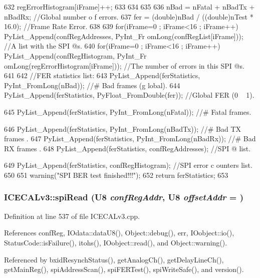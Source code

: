 \begin{DoxyCode}
{{{{632                 regErrorHistogram[iFrame]++;
633             }
634         }
635     }
636     nBad = nFatal + nBadTx + nBadRx;                            //Global number o
      f errors.
637     fer = (double)nBad / ((double)nTest * 16.0);    //Frame Rate Error.
638 
639     for(iFrame=0 ; iFrame<16 ; iFrame++) PyList_Append(confRegAddresses, PyInt_Fr
      omLong(confRegList[iFrame]));               //A list with the SPI @s.
640     for(iFrame=0 ; iFrame<16 ; iFrame++) PyList_Append(confRegHistogram, PyInt_Fr
      omLong(regErrorHistogram[iFrame])); //The number of errors in this SPI @s.
641 
642     //FER statistics list:
643     PyList_Append(ferStatistics, PyInt_FromLong(nBad));         //# Bad frames (g
      lobal).
644     PyList_Append(ferStatistics, PyFloat_FromDouble(fer));  //Global FER (0 ~ 1).
      
645     PyList_Append(ferStatistics, PyInt_FromLong(nFatal));       //# Fatal frames.
      
646     PyList_Append(ferStatistics, PyInt_FromLong(nBadTx));       //# Bad TX frames
      .
647     PyList_Append(ferStatistics, PyInt_FromLong(nBadRx));       //# Bad RX frames
      .
648     PyList_Append(ferStatistics, confRegAddresses);                 //SPI @ list.
      
649     PyList_Append(ferStatistics, confRegHistogram);                 //SPI error c
      ounters list.
650 
651     warning("SPI BER test finished!!!");
652     return ferStatistics;
653 }
\end{DoxyCode}
\hypertarget{classICECALv3_aced41ce20a0853d6248b8df88412e57a}{
\subsubsection[{spiRead}]{ ICECALv3::spiRead ({\bf U8} {\em confRegAddr}, \/  {\bf U8} {\em offsetAddr} = {})}}
\label{classICECALv3_aced41ce20a0853d6248b8df88412e57a}


Definition at line 537 of file ICECALv3.cpp.

References confReg, IOdata::dataU8(), Object::debug(), err, IOobject::io(), StatusCode::isFailure(), itohs(), IOobject::read(), and Object::warning().

Referenced by bxidResynchStatus(), getAnalogCh(), getDelayLineCh(), getMainReg(), spiAddressScan(), spiFERTest(), spiWriteSafe(), and version().


